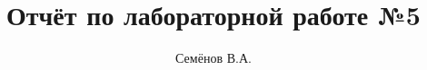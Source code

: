 \title{Отчёт по лабораторной работе №5}
\author{Семёнов В.А.}

\usepackage[a4paper, left=20mm, top=15mm, right=15mm, bottom=15mm]{geometry}
\setmainfont{Lato}

\usepackage{caption}
\captionsetup[figure]{name=Рисунок, labelsep=endash}

\renewcommand{\contentsname}{Оглавление}


\usepackage{titlesec}
\newcommand{\sectionbreak}{\clearpage}

\usepackage{fancyhdr}
\pagestyle{fancy}
\fancyhf{}
\renewcommand{\headrulewidth}{0pt}